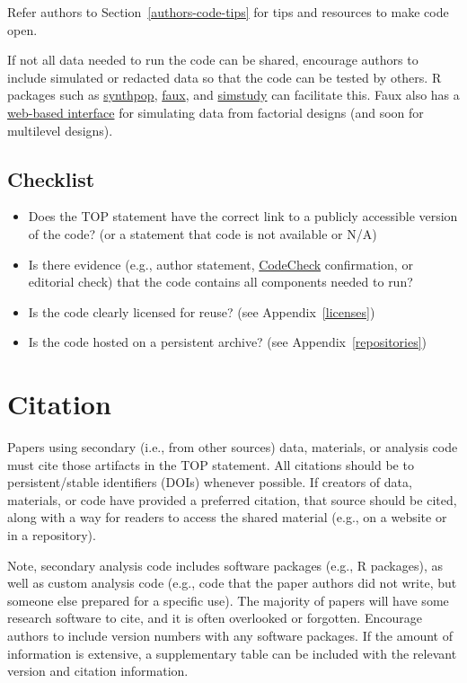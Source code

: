 \documentclass[
  oneside]{book}
\providecommand{\tightlist}{%
  \setlength{\itemsep}{0pt}\setlength{\parskip}{0pt}}
\begin{document}
Refer authors to Section~\ref{authors-code-tips} for tips and resources to make code open.

If not all data needed to run the code can be shared, encourage authors to include simulated or redacted data so that the code can be tested by others. R packages such as \href{https://www.synthpop.org.uk/}{synthpop}, \href{https://debruine.github.io/faux/}{faux}, and \href{https://kgoldfeld.github.io/simstudy/}{simstudy} can facilitate this. Faux also has a \href{https://shiny.psy.gla.ac.uk/debruine/fauxapp/}{web-based interface} for simulating data from factorial designs (and soon for multilevel designs).

\hypertarget{checklist-3}{%
\section{Checklist}\label{checklist-3}}

\begin{itemize}
\tightlist
\item
  Does the TOP statement have the correct link to a publicly accessible version of the code? (or a statement that code is not available or N/A)
\item
  Is there evidence (e.g., author statement, \href{https://codecheck.org.uk/}{CodeCheck} confirmation, or editorial check) that the code contains all components needed to run?
\item
  Is the code clearly licensed for reuse? (see Appendix~\ref{licenses})
\item
  Is the code hosted on a persistent archive? (see Appendix~\ref{repositories})
\end{itemize}

\hypertarget{editors-citation}{%
\chapter{Citation}\label{editors-citation}}

Papers using secondary (i.e., from other sources) data, materials, or analysis code must cite those artifacts in the TOP statement. All citations should be to persistent/stable identifiers (DOIs) whenever possible. If creators of data, materials, or code have provided a preferred citation, that source should be cited, along with a way for readers to access the shared material (e.g., on a website or in a repository).

Note, secondary analysis code includes software packages (e.g., R packages), as well as custom analysis code (e.g., code that the paper authors did not write, but someone else prepared for a specific use). The majority of papers will have some research software to cite, and it is often overlooked or forgotten. Encourage authors to include version numbers with any software packages. If the amount of information is extensive, a supplementary table can be included with the relevant version and citation information.
\end{document}
